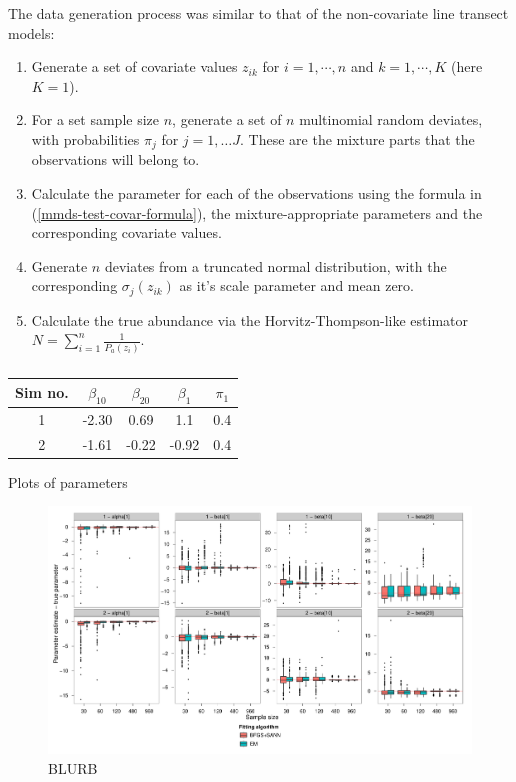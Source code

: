 The data generation process was similar to that of the non-covariate line transect models:
\begin{enumerate}
   \item Generate a set of covariate values $z_{ik}$ for $i=1,\cdots,n$ and $k=1,\cdots,K$ (here $K=1$). 
	\item For a set sample size $n$, generate a set of $n$ multinomial random deviates, with probabilities $\pi_j$ for $j=1,\ldots J$. These are the mixture parts that the observations will belong to.
   \item Calculate the parameter for each of the observations using the formula in (\ref{mmds-test-covar-formula}), the mixture-appropriate parameters and the corresponding covariate values.
	\item Generate $n$ deviates from a truncated normal distribution, with the corresponding $\sigma_j(z_{ik})$ as it's scale parameter and mean zero.
	\item Calculate the true abundance via the Horvitz-Thompson-like estimator $N=\sum_{i=1}^n \frac{1}{P_a(z_i)}$.
\end{enumerate}


\begin{table}[ht]
\centering
\begin{tabular}{c c c c c}
Sim no. & $\beta_{10}$ & $\beta_{20}$ & $\beta_1$ & $\pi_1$\\
\hline
\hline
1 & -2.30 &  0.69 &  1.1  & 0.4 \\
2 & -1.61 & -0.22 & -0.92 & 0.4 \\
\end{tabular}
\label{mmds-cov-simtable}
\caption{}
\end{table}



Plots of parameters

\begin{figure}
\centering
\includegraphics[width=6.84in]{mix/figs/cov-boxplots.pdf}
\caption{BLURB}
\label{mmds-cov-boxplots}
\end{figure}

